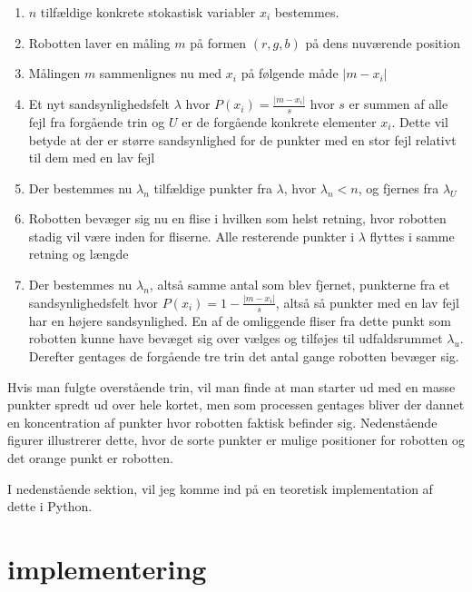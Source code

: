 \documentclass[../../SRP.tex]{subfiles}
\begin{document}
\begin{enumerate}
  \item $n$ tilfældige konkrete stokastisk variabler $x_i$ bestemmes.

  \item Robotten laver en måling $m$ på formen $(r,g,b)$ på dens nuværende position

  \item Målingen $m$ sammenlignes nu med $x_i$ på følgende måde $|m - x_i|$

  \item Et nyt sandsynlighedsfelt $\lambda$ hvor $P(x_i) = \frac{|m - x_i|}{s}$ hvor $s$ er summen af alle fejl fra forgående trin og $U$ er de forgående konkrete elementer $x_i$. Dette vil betyde at der er større sandsynlighed for de punkter med en stor fejl relativt til dem med en lav fejl

  \item Der bestemmes nu $\lambda_n$ tilfældige punkter fra $\lambda$, hvor $ \lambda_n < n$, og fjernes fra $\lambda_U$

  \item Robotten bevæger sig nu en flise i hvilken som helst retning, hvor robotten stadig vil være inden for fliserne. Alle resterende punkter i $\lambda$ flyttes i samme retning og længde 

  \item Der bestemmes nu $\lambda_n$, altså samme antal som blev fjernet, punkterne fra et sandsynlighedsfelt hvor $P(x_i) = 1-\frac{|m-x_i|}{s}$, altså så punkter med en lav fejl har en højere sandsynlighed. En af de omliggende fliser fra dette punkt som robotten kunne have bevæget sig over vælges og tilføjes til udfaldsrummet $\lambda_u$. Derefter gentages de forgående tre trin det antal gange robotten bevæger sig.
\end{enumerate}
Hvis man fulgte overstående trin, vil man finde at man starter ud med en masse punkter spredt ud over hele kortet, men som processen gentages bliver der dannet en koncentration af punkter hvor robotten faktisk befinder sig. Nedenstående figurer illustrerer dette, hvor de sorte punkter er mulige positioner for robotten og det orange punkt er robotten.
\begin{center}
\end{center}
I nedenstående sektion, vil jeg komme ind på en teoretisk implementation af dette i Python.

\section{implementering}
\end{document}
